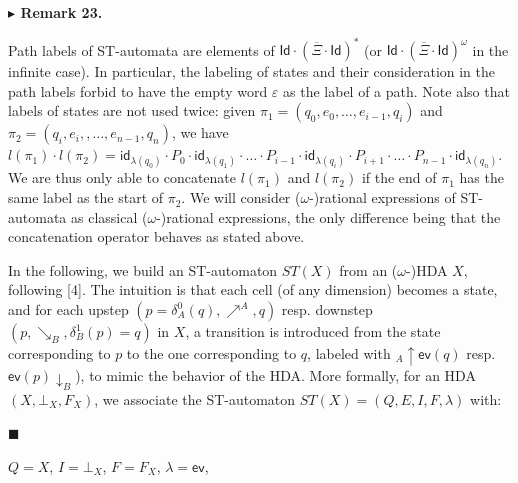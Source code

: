  
\par\medskip\noindent\textbf{$\blacktriangleright$ Remark 23.}\par
 
 
Path labels of ST-automata are elements of $\mathsf{Id}\cdot(\overline{\Xi}\cdot\mathsf{Id})^{*}$ (or $\mathsf{Id}\cdot(\overline{\Xi}\cdot\mathsf{Id})^{\omega}$ in the infinite case). In particular, the labeling of states and their consideration in the path labels forbid to have the empty word $\varepsilon$ as the label of a path. Note also that labels of states are not used twice: given $\pi_{1}=(q_{0},e_{0},\dots,e_{i-1},q_{i})$ and $\pi_{2}=(q_{i},e_{i},,\dots,e_{n-1},q_{n})$, we have $l(\pi_{1})\cdot l(\pi_{2})=\mathsf{id}_{\lambda(q_{0})}\cdot P_{0}\cdot\mathsf{id}_{\lambda(q_{1})}\cdot\ldots\cdot P_{i-1}\cdot\mathsf{id}_{\lambda(q_{i})}\cdot P_{i+1}\cdot\ldots\cdot P_{n-1}\cdot\mathsf{id}_{\lambda(q_{n})}$. We are thus only able to concatenate $l(\pi_{1})$ and $l(\pi_{2})$ if the end of $\pi_{1}$ has the same label as the start of $\pi_{2}$. We will consider ($\omega$-)rational expressions of ST-automata as classical ($\omega$-)rational expressions, the only difference being that the concatenation operator behaves as stated above.\par
 
 
 
 
In the following, we build an ST-automaton $ST(X)$ from an ($\omega$-)HDA $X$, following [4]. The intuition is that each cell (of any dimension) becomes a state, and for each upstep $(p=\delta_{A}^{0}(q),{\mathrel{\nearrow^{A}}},q)$ resp. downstep $(p,\mathrel{\searrow_{B}},\delta_{B}^{1}(p)=q)$ in $X$, a transition is introduced from the state corresponding to $p$ to the one corresponding to $q$, labeled with ${}_{A\!}{\uparrow}{\mathsf{ev}(q)}$ resp. ${\mathsf{ev}(p)}{\downarrow}_{B}$), to mimic the behavior of the HDA. More formally, for an HDA $(X,\bot_{X},F_{X})$, we associate the ST-automaton $ST(X)=(Q,E,I,F,\lambda)$ with:\par
  
\par\noindent  $\blacksquare$ 
 
$Q=X$, $I=\bot_{X}$, $F=F_{X}$, $\lambda=\mathsf{ev}$,\par
 
